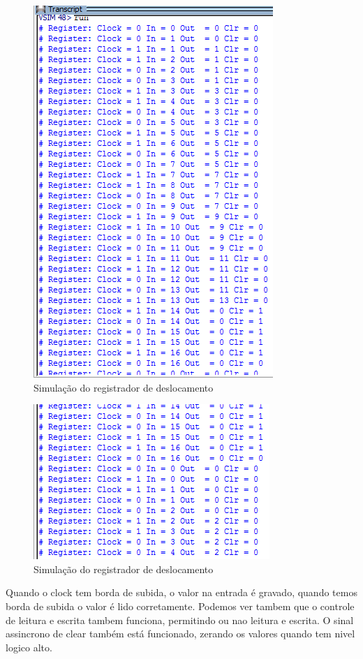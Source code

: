 \documentclass[a4paper, 10pt]{article}
\begin{document}
\begin{itemize}
\begin{figure}[H]
		\includegraphics[scale=0.7]{REGsimu0.PNG}
		\caption{Simulação do registrador de deslocamento}
		\label{Rotulo}
	\end{figure}
	\begin{figure}[H]
		\centering
		\includegraphics[scale=0.7]{REGsimu1.PNG}
		\caption{Simulação do registrador de deslocamento}
		\label{Rotulo}
	\end{figure}
	\vfill
	Quando o clock tem borda de subida, o valor na entrada é gravado, quando temos borda de subida o valor é lido corretamente. Podemos ver tambem que o controle de leitura e escrita tambem funciona, permitindo ou nao leitura e escrita. O sinal assincrono de clear também está funcionado, zerando os valores quando tem nivel logico alto.

\end{itemize}
\end{document}
